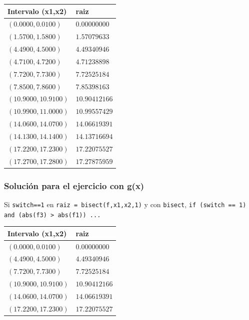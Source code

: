 \documentclass[12pt]{beamer}
\begin{document}
\begin{frame}
\fontsize{12}{12}\selectfont
\begin{center}
	\begin{tabular}{ p{4cm} | p{4cm} }
		Intervalo (x1,x2) &   raiz \\ \hline
		$(0.0000, 0.0100)$ & $0.00000000$ \\ \hline
		$(1.5700, 1.5800)$ &  $1.57079633$ \\ \hline
		$(4.4900, 4.5000)$ &  $4.49340946$ \\ \hline
		$(4.7100, 4.7200)$ &  $4.71238898$ \\ \hline
		$(7.7200, 7.7300)$ &  $7.72525184$ \\ \hline
		$(7.8500, 7.8600)$ &  $7.85398163$ \\ \hline
		$(10.9000, 10.9100)$ &  $10.90412166$ \\ \hline
		$(10.9900, 11.0000)$ &  $10.99557429$ \\ \hline
		$(14.0600, 14.0700)$ &  $14.06619391$ \\ \hline
		$(14.1300, 14.1400)$ &  $14.13716694$ \\ \hline
		$(17.2200, 17.2300)$ &  $17.22075527$ \\ \hline
		$(17.2700, 17.2800)$ &  $17.27875959$ 
	\end{tabular}
\end{center}
\end{frame}
\begin{frame}
\frametitle{Soluci\'{o}n para el ejercicio con g(x)}
Si \texttt{switch==1} en \texttt{raiz = bisect(f,x1,x2,1)}  y con \texttt{bisect}, \texttt{if (switch == 1) and (abs(f3) > abs(f1)) ...}
\\
\medskip
\begin{center}
	\begin{tabular}{ p{4cm} | p{4cm} }
		Intervalo (x1,x2) &   raiz \\ \hline
		$(0.0000, 0.0100)$ & $0.00000000$ \\ \hline
		$(4.4900, 4.5000)$ &  $4.49340946$ \\ \hline
		$(7.7200, 7.7300)$ &  $7.72525184$ \\ \hline
		$(10.9000, 10.9100)$ &  $10.90412166$ \\ \hline
		$(14.0600, 14.0700)$ &  $14.06619391$ \\ \hline
		$(17.2200, 17.2300)$ &  $17.22075527$
	\end{tabular}
\end{center}
\end{frame}
\end{document}

